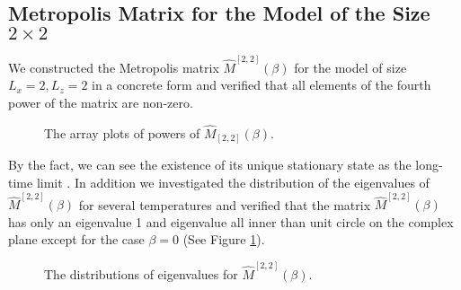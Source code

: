 \subsection{Metropolis Matrix for the Model of the Size $2\times 2$}

We constructed the Metropolis matrix $\hat{M}^{[2,2]}(\beta)$ for the model of size $L_{x}=2,L_{z}=2$ in a concrete form and verified that all elements of the fourth power of the matrix are non-zero.

\begin{figure}[htbp]
	\centering
	\caption{The array plots of powers of $\hat{M}_{[2,2]}(\beta)$.}
\end{figure}

By the fact, we can see the existence of its unique stationary state as the long-time limit . In addition we investigated the distribution of the eigenvalues of $\hat{M}^{[2,2]}(\beta)$ for several temperatures and verified that the matrix $\hat{M}^{[2,2]}(\beta)$ has only an eigenvalue 1 and eigenvalue all inner than unit circle on the complex plane except for the case $\beta=0$ (See Figure \ref{fig:EigDistMbeta}).

\begin{figure}[htbp]
	\centering
	\caption{The distributions of eigenvalues for $\hat{M}^{[2,2]}(\beta)$.}\label{fig:EigDistMbeta}
\end{figure}